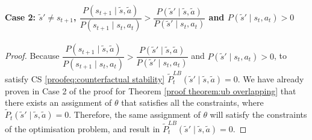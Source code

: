 \paragraph{Case 2: $\tilde{s}' \neq s_{t+1}$, $\dfrac{P(s_{t+1} \mid \tilde{s}, \tilde{a})}{P(s_{t+1} \mid s_t, a_t)}>\dfrac{P(\tilde{s}' \mid \tilde{s}, \tilde{a})}{P(\tilde{s}' \mid s_t, a_t)}$ and $P(\tilde{s}' \mid s_t, a_t) > 0$}
\noindent
\begin{proof}
Because $\dfrac{P(s_{t+1} \mid \tilde{s}, \tilde{a})}{P(s_{t+1} \mid s_t, a_t)}>\dfrac{P(\tilde{s}' \mid \tilde{s}, \tilde{a})}{P(\tilde{s}' \mid s_t, a_t)}$ and $P(\tilde{s}' \mid s_t, a_t) > 0$, to satisfy CS \eqref{proofeq:counterfactual stability} $\tilde{P}_{t}^{LB}(\tilde{s}' \mid \tilde{s}, \tilde{a}) = 0$. We have already proven in Case 2 of the proof for Theorem \ref{proof theorem:ub overlapping} that there exists an assignment of $\theta$ that satisfies all the constraints, where $\tilde{P}_{t}(\tilde{s}' \mid \tilde{s}, \tilde{a}) = 0$. Therefore, the same assignment of $\theta$ will satisfy the constraints of the optimisation problem, and result in $\tilde{P}_{t}^{LB}(\tilde{s}' \mid \tilde{s}, \tilde{a}) = 0$.
\end{proof}